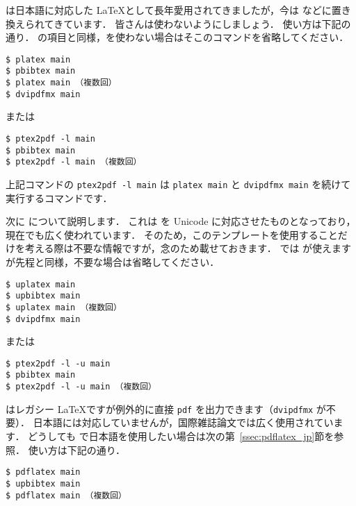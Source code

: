 \pLaTeX は日本語に対応した \LaTeX として長年愛用されてきましたが，今は \LuaLaTeX などに置き換えられてきています．
皆さんは使わないようにしましょう．
使い方は下記の通り．
\LuaLaTeX の項目と同様，\BibTeX を使わない場合はそこのコマンドを省略してください．

\begin{tcolorbox}[enhanced, title=\pLaTeX$+$\pBibTeX, drop fuzzy shadow]
\begin{verbatim}
$ platex main
$ pbibtex main
$ platex main （複数回）
$ dvipdfmx main
\end{verbatim}
または
\begin{verbatim}
$ ptex2pdf -l main
$ pbibtex main
$ ptex2pdf -l main （複数回）
\end{verbatim}
\end{tcolorbox}

上記コマンドの \verb|ptex2pdf -l main| は \verb|platex main| と \verb|dvipdfmx main| を続けて実行するコマンドです．

次に \upLaTeX について説明します．
これは \pLaTeX を Unicode に対応させたものとなっており，現在でも広く使われています．
そのため，このテンプレートを使用することだけを考える際は不要な情報ですが，念のため載せておきます．
\upLaTeX では \upBibTeX が使えますが先程と同様，不要な場合は省略してください．

\begin{tcolorbox}[enhanced, title=\upLaTeX$+$\upBibTeX, drop fuzzy shadow]
\begin{verbatim}
$ uplatex main
$ upbibtex main
$ uplatex main （複数回）
$ dvipdfmx main
\end{verbatim}
または
\begin{verbatim}
$ ptex2pdf -l -u main
$ pbibtex main
$ ptex2pdf -l -u main （複数回）
\end{verbatim}
\end{tcolorbox}

\pLaTeX はレガシー \LaTeX ですが例外的に直接 \verb|pdf| を出力できます（\verb|dvipdfmx| が不要）．
日本語には対応していませんが，国際雑誌論文では広く使用されています．
どうしても \pdfLaTeX で日本語を使用したい場合は次の第~\ref{ssec:pdflatex_jp}節を参照．
使い方は下記の通り．

\begin{tcolorbox}[enhanced, title=\pdfLaTeX$+$\upBibTeX, drop fuzzy shadow]
\begin{verbatim}
$ pdflatex main
$ upbibtex main
$ pdflatex main （複数回）
\end{verbatim}
\end{tcolorbox}


